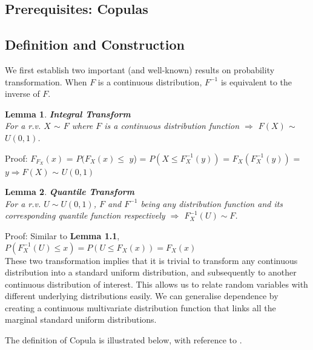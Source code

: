 \documentclass[12pt]{report}
\newtheorem{lemma}{Lemma}[subsection]
\newcommand{\1}{\mathbf{1}}
\begin{document}
\begin{flushleft}
\newpage

\section{Prerequisites: Copulas}
\vspace{0.5cm}
\subsection{Definition and Construction}
\vspace{0.5cm}

We first establish two important (and well-known) results on probability transformation. When $F$ is a continuous distribution, $F^{-1}$ is equivalent to the inverse of $F$.\\


\begin{lemma}\label{IntegralTransform} 
\textbf{Integral Transform} \\

For a r.v. $X$ $\sim$ $F$ where $F$ is a continuous distribution function $\Rightarrow$ $F(X)$ $\sim$ $U(0,1)$.
\end{lemma}
Proof:  \parencite{HofertBook} $F_{F_{X}}(x)$ = $P(F_{X}(x) $$\le$ $y$) = $P(X \le F^{-1}_{X}(y))$ = $F_{X}(F^{-1}_{X}(y))$ = $y \Rightarrow F(X)$ $\sim$ $U(0,1)$ 
\\


\begin{lemma}\label{QuantileTransform}
\textbf{Quantile Transform} \\

For a r.v. $U \sim U(0,1)$, $F$ and $F^{-1}$ being any distribution function and its corresponding quantile function respectively $\Rightarrow$ $F^{-1}_{X}(U) \sim F $.
\end{lemma}
Proof: Similar to \textbf{Lemma 1.1}, $P(F^{-1}_{X}(U) \le x) = P(U \le F_{X}(x)) = F_{X}(x)$
\\

\vspace{0.5cm}
These two transformation implies that it is trivial to transform any continuous distribution into a standard uniform distribution, and subsequently to another continuous distribution of interest. This allows us to relate random variables with different underlying distributions easily. We can generalise dependence by creating a continuous multivariate distribution function that links all the marginal standard uniform distributions. 

\vspace{0.5cm}
The definition of Copula is illustrated below, with reference to \cite{HofertBook}.\\


\end{flushleft}
\end{document}
